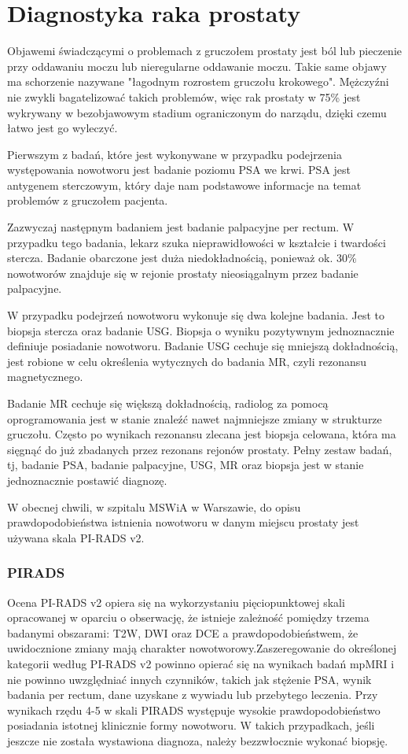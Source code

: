 \documentclass[a4paper,11pt,twoside]{report}
\theoremstyle{definition}
\begin{document}
\section{Diagnostyka raka prostaty}
Objawemi świadczącymi o problemach z gruczołem prostaty jest ból lub pieczenie przy oddawaniu moczu lub nieregularne oddawanie moczu. Takie same objawy ma schorzenie nazywane "łagodnym rozrostem gruczołu krokowego". Mężczyźni nie zwykli bagatelizować takich problemów, więc rak prostaty w 75\% jest wykrywany w bezobjawowym stadium ograniczonym do narządu, dzięki czemu łatwo jest go wyleczyć. 
\par
Pierwszym z badań, które jest wykonywane w przypadku podejrzenia występowania nowotworu jest badanie poziomu PSA we krwi. PSA jest antygenem sterczowym, który daje nam podstawowe informacje na temat problemów z gruczołem pacjenta.
\par
Zazwyczaj następnym badaniem jest badanie palpacyjne per rectum. W przypadku tego badania, lekarz szuka nieprawidłowości w kształcie i twardości stercza. Badanie obarczone jest duża niedokładnością, ponieważ ok. 30\% nowotworów znajduje się w rejonie prostaty nieosiągalnym przez badanie palpacyjne. 
\par
W przypadku podejrzeń nowotworu wykonuje się dwa kolejne badania. Jest to biopsja stercza oraz badanie USG. Biopsja o wyniku pozytywnym jednoznacznie definiuje posiadanie nowotworu. Badanie USG cechuje się mniejszą dokładnością,  jest robione w celu określenia wytycznych do badania MR, czyli rezonansu magnetycznego.
\par
Badanie MR cechuje się większą dokładnością, radiolog za pomocą oprogramowania jest w stanie znaleźć nawet najmniejsze zmiany w strukturze gruczołu. Często po wynikach rezonansu zlecana jest biopsja celowana, która ma sięgnąć do już zbadanych przez rezonans rejonów prostaty. 
Pełny zestaw badań, tj, badanie PSA, badanie palpacyjne, USG, MR oraz biopsja jest w stanie jednoznacznie postawić diagnozę.
\par
W obecnej chwili, w szpitalu MSWiA w Warszawie, do opisu prawdopodobieństwa istnienia nowotworu w danym miejscu prostaty jest używana skala PI-RADS v2.

\subsubsection{PIRADS} 
Ocena PI-RADS v2 opiera się na wykorzystaniu pięciopunktowej skali opracowanej w oparciu o obserwację, że istnieje zależność pomiędzy trzema badanymi obszarami: T2W, DWI oraz DCE a prawdopodobieństwem, że uwidocznione zmiany mają charakter nowotworowy.Zaszeregowanie do określonej kategorii według PI-RADS v2 powinno opierać się na wynikach badań mpMRI i nie powinno uwzględniać innych czynników, takich jak stężenie PSA, wynik badania per rectum, dane uzyskane z wywiadu lub przebytego leczenia. Przy wynikach rzędu 4-5 w skali PIRADS występuje wysokie prawdopodobieństwo posiadania istotnej klinicznie formy nowotworu. W takich przypadkach, jeśli jeszcze nie została wystawiona diagnoza, należy bezzwłocznie wykonać biopsję.
\end{document}
